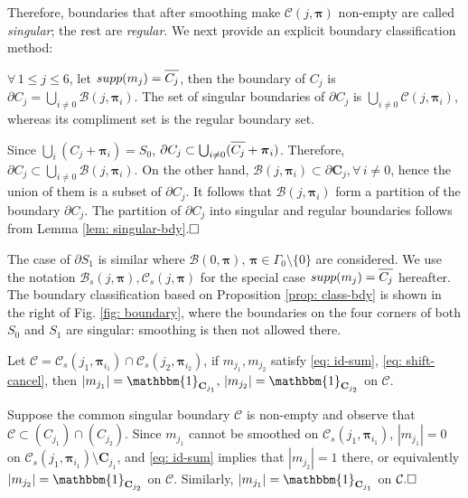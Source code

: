 Therefore, boundaries that after smoothing make $\mathcal{C}(j,\boldsymbol{\pi})$ non-empty are called {\it singular}; the rest are {\it regular}. We next provide an explicit boundary classification method:
\begin{prop}\label{prop: class-bdy}
$\forall\, 1\leq j\leq 6$, let $supp(m_j) = \ov{$C_j$}$, then the boundary of $C_j$ is $\partial C_j=\bigcup_{i \neq 0}\mathcal{B}(j,\boldsymbol{\pi}_i)$. The set of singular boundaries of $\partial C_j$ is $\bigcup_{i\neq 0}\mathcal{C}(j,\boldsymbol{\pi}_i)$, whereas its compliment set is the regular boundary set.
 \end{prop}
 Since $\bigcup_i(C_j+\boldsymbol{\pi}_i) = S_0$, $\partial C_j\subset \bigcup_{i\neq 0} (\ov{$C_j$}+\boldsymbol{\pi}_i) $. Therefore, $\partial C_j\subset\bigcup_{i\neq 0}\mathcal{B}(j,\boldsymbol{\pi}_i)$. On the other hand, $\mathcal{B}(j,\boldsymbol{\pi}_i)\subset \partial\mathbf{C}_j, \forall \, i\neq 0$, hence the union of them is a subset of $\partial C_j$. It follows that $\mathcal{B}(j,\boldsymbol{\pi}_i)$ form a partition of the boundary $\partial C_j$. The partition of $\partial C_j$ into singular and regular boundaries follows from Lemma \ref{lem: singular-bdy}.$\hfill\square$

 The case of $\partial S_1$ is similar where $\mathcal{B}(0,\boldsymbol{\pi}),\,\boldsymbol{\pi}\in\Gamma_0\setminus\{0\}$ are considered. We use the notation $\mathcal{B}_s(j,\boldsymbol{\pi}),\mathcal{C}_s(j,\boldsymbol{\pi})$ for the special case $supp(m_j) = \ov{$C_j$}$ hereafter.
The boundary classification based on Proposition \ref{prop: class-bdy} is shown in the right of Fig. \ref{fig: boundary}, where the boundaries on the four corners of both $S_0$ and $S_1$ are singular: smoothing is then not allowed there.

\begin{prop}\label{prop: jump}
Let $\mathcal{C} = \mathcal{C}_s(j_1,\boldsymbol{\pi}_{i_1})\cap \mathcal{C}_s(j_2,\boldsymbol{\pi}_{i_2})$, if $m_{j_1}, m_{j_2}$ satisfy \eqref{eq: id-sum}, \eqref{eq: shift-cancel}, then $|m_{j_1}|=\mathbbm{1}_{\mathbf{C}_{j_1}},\,|m_{j_2}|=\mathbbm{1}_{\mathbf{C}_{j_2}}$ on $\mathcal{C}$.
\end{prop}
 Suppose the common singular boundary $\mathcal{C}$ is non-empty and observe that $\mathcal{C}\subset(C_{j_1})\cap(C_{j_2})$. Since $m_{j_1}$ cannot be smoothed on $\mathcal{C}_s(j_1,\boldsymbol{\pi}_{i_1})$, $|m_{j_1}| = 0$ on $\mathcal{C}_s(j_1,\boldsymbol{\pi}_{i_1})\setminus\mathbf{C}_{j_1}$, 
and \eqref{eq: id-sum} implies that $|m_{j_2}| = 1$ there, or equivalently $|m_{j_2}|=\mathbbm{1}_{\mathbf{C}_{j_2}}$ on $\mathcal{C}$. Similarly, $|m_{j_1}|=\mathbbm{1}_{\mathbf{C}_{j_1}}$ on $\mathcal{C}.\hfill\square$

